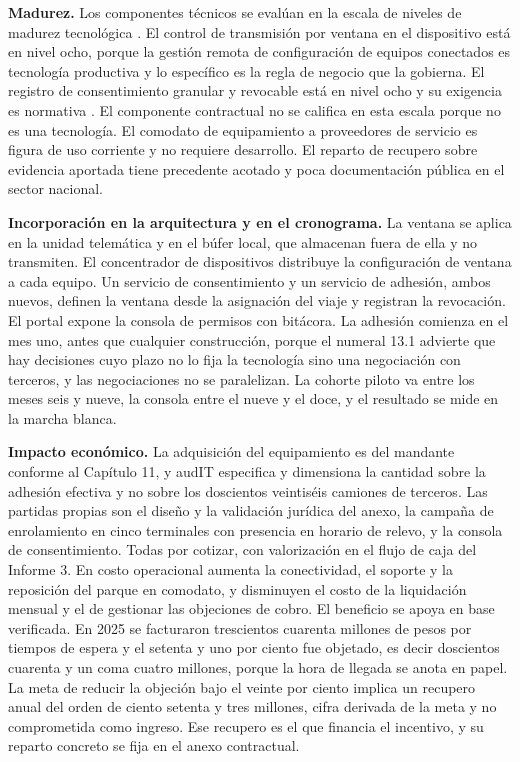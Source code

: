 \textbf{Madurez.} Los componentes técnicos se evalúan en la escala de niveles de madurez
tecnológica \parencite{iso16290}. El control de transmisión por ventana en el dispositivo está en
nivel ocho, porque la gestión remota de configuración de equipos conectados es tecnología
productiva y lo específico es la regla de negocio que la gobierna. El registro de consentimiento
granular y revocable está en nivel ocho y su exigencia es normativa \parencite{ley21719}. El
componente contractual no se califica en esta escala porque no es una tecnología. El comodato de
equipamiento a proveedores de servicio es figura de uso corriente y no requiere desarrollo. El
reparto de recupero sobre evidencia aportada tiene precedente acotado y poca documentación pública
en el sector nacional.

\textbf{Incorporación en la arquitectura y en el cronograma.} La ventana se aplica en la unidad
telemática y en el búfer local, que almacenan fuera de ella y no transmiten. El concentrador de
dispositivos distribuye la configuración de ventana a cada equipo. Un servicio de consentimiento y
un servicio de adhesión, ambos nuevos, definen la ventana desde la asignación del viaje y registran
la revocación. El portal expone la consola de permisos con bitácora. La adhesión comienza en el mes
uno, antes que cualquier construcción, porque el numeral 13.1 advierte que hay decisiones cuyo
plazo no lo fija la tecnología sino una negociación con terceros, y las negociaciones no se
paralelizan. La cohorte piloto va entre los meses seis y nueve, la consola entre el nueve y el
doce, y el resultado se mide en la marcha blanca.

\textbf{Impacto económico.} La adquisición del equipamiento es del mandante conforme al Capítulo
11, y audIT especifica y dimensiona la cantidad sobre la adhesión efectiva y no sobre los
doscientos veintiséis camiones de terceros. Las partidas propias son el diseño y la validación
jurídica del anexo, la campaña de enrolamiento en cinco terminales con presencia en horario de
relevo, y la consola de consentimiento. Todas por cotizar, con valorización en el flujo de caja del
Informe 3. En costo operacional aumenta la conectividad, el soporte y la reposición del parque en
comodato, y disminuyen el costo de la liquidación mensual y el de gestionar las objeciones de
cobro. El beneficio se apoya en base verificada. En 2025 se facturaron trescientos cuarenta
millones de pesos por tiempos de espera y el setenta y uno por ciento fue objetado, es decir
doscientos cuarenta y un coma cuatro millones, porque la hora de llegada se anota en papel. La meta
de reducir la objeción bajo el veinte por ciento implica un recupero anual del orden de ciento
setenta y tres millones, cifra derivada de la meta y no comprometida como ingreso. Ese recupero es
el que financia el incentivo, y su reparto concreto se fija en el anexo contractual.

